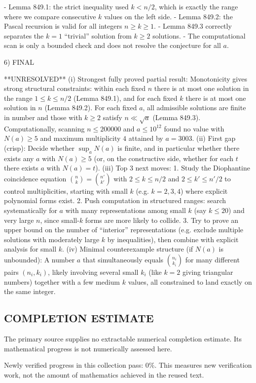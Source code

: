 - Lemma 849.1: the strict inequality used $k< n/2$, which is exactly the range where we compare consecutive $k$ values on the left side.
- Lemma 849.2: the Pascal recursion is valid for all integers $n\ge k\ge 1$.
- Lemma 849.3 correctly separates the $k=1$ “trivial” solution from $k\ge 2$ solutions.
- The computational scan is only a bounded check and does not resolve the conjecture for all $a$.

6) FINAL

**UNRESOLVED**
(i) Strongest fully proved partial result: Monotonicity gives strong structural constraints: within each fixed $n$ there is at most one solution in the range $1\le k\le n/2$ (Lemma 849.1), and for each fixed $k$ there is at most one solution in $n$ (Lemma 849.2). For each fixed $a$, all admissible solutions are finite in number and those with $k\ge 2$ satisfy $n\ll \sqrt{a}$ (Lemma 849.3). Computationally, scanning $n\le 200000$ and $a\le 10^{12}$ found no value with $N(a)\ge 5$ and maximum multiplicity $4$ attained by $a=3003$.
(ii) First gap (crisp): Decide whether $\sup_a N(a)$ is finite, and in particular whether there exists any $a$ with $N(a)\ge 5$ (or, on the constructive side, whether for each $t$ there exists $a$ with $N(a)=t$).
(iii) Top 3 next moves:
  1. Study the Diophantine coincidence equation $\binom{n}{k}=\binom{n'}{k'}$ with $2\le k\le n/2$ and $2\le k'\le n'/2$ to control multiplicities, starting with small $k$ (e.g. $k=2,3,4$) where explicit polynomial forms exist.
  2. Push computation in structured ranges: search systematically for $a$ with many representations among small $k$ (say $k\le 20$) and very large $n$, since small-$k$ forms are more likely to collide.
  3. Try to prove an upper bound on the number of “interior” representations (e.g. exclude multiple solutions with moderately large $k$ by inequalities), then combine with explicit analysis for small $k$.
(iv) Minimal counterexample structure (if $N(a)$ is unbounded): A number $a$ that simultaneously equals $\binom{n_i}{k_i}$ for many different pairs $(n_i,k_i)$, likely involving several small $k_i$ (like $k=2$ giving triangular numbers) together with a few medium $k$ values, all constrained to land exactly on the same integer.




\subsection*{COMPLETION ESTIMATE}
The primary source supplies no extractable numerical completion estimate. Its mathematical progress is not numerically assessed here.

Newly verified progress in this collection pass: $0\%$. This measures new verification work, not the amount of mathematics achieved in the reused text.
